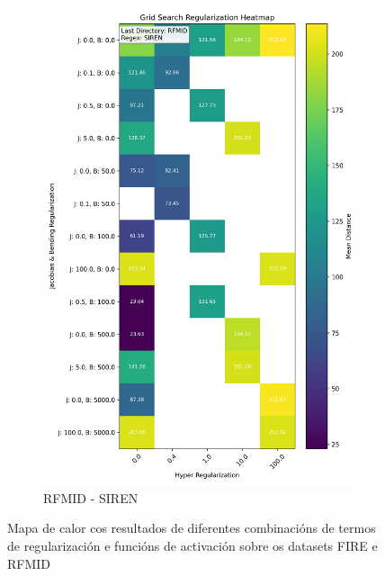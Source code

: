 \begin{figure}[ht]
\begin{subfigure}[b]{0.4\textwidth}
        \includegraphics[width=\textwidth]{imaxes/grid_search_single_heatmap_RFMID_SIREN.png}
        \caption{RFMID - SIREN}
        \label{fig:gs_single_RFMID_SIREN}
    \end{subfigure}
    
    \caption{Mapa de calor cos resultados de diferentes combinacións de termos de regularización e funcións de activación sobre os datasets FIRE e RFMID}
    \label{fig:gs_single_heatmaps}
\end{figure}
